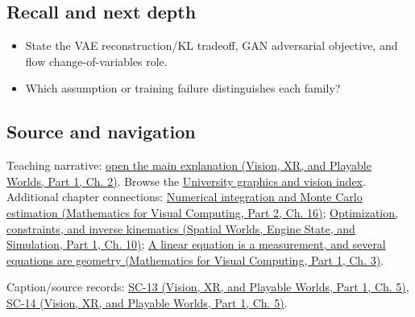 \subsection{Recall and next depth}\label{appendix-2c568f05ee34-recall-and-next-depth}

\hypertarget{appendix-2c568f05ee34-recall-and-next-depth}{}

\begin{itemize}
\tightlist
\item
  State the VAE reconstruction/KL tradeoff, GAN adversarial objective, and flow change-of-variables role.
\item
  Which assumption or training failure distinguishes each family?
\end{itemize}

\subsection{Source and navigation}\label{appendix-2c568f05ee34-source-and-navigation}

\hypertarget{appendix-2c568f05ee34-source-and-navigation}{}

Teaching narrative: \href{../07-Vision-XR-and-Playable-Worlds-P01/main.pdf\#nameddest=04-visual-computing-ii-ch031-generative-models-learn-distributions-and-samplers}{open the main explanation (Vision, XR, and Playable Worlds, Part 1, Ch. 2)}. Browse the \hyperref[appendix-a6d556a4ef50-university-graphics-vision-and-photography---independent-series]{University graphics and vision index}. Additional chapter connections: \href{../02-Mathematics-for-Visual-Computing-P02/main.pdf\#nameddest=03-visual-computing-i-ch012-numerical-integration-and-monte-carlo-estimation}{Numerical integration and Monte Carlo estimation (Mathematics for Visual Computing, Part 2, Ch. 16)}; \href{../05-Spatial-Worlds-Engine-State-and-Simulation-P01/main.pdf\#nameddest=04-visual-computing-ii-ch029-optimization-constraints-and-inverse-kinematics}{Optimization, constraints, and inverse kinematics (Spatial Worlds, Engine State, and Simulation, Part 1, Ch. 10)}; \href{../02-Mathematics-for-Visual-Computing-P01/main.pdf\#nameddest=01-foundations-i-ch019-a-linear-equation-is-a-measurement-and-several-equations-are-geometry}{A linear equation is a measurement, and several equations are geometry (Mathematics for Visual Computing, Part 1, Ch. 3)}.

Caption/source records: \href{../07-Vision-XR-and-Playable-Worlds-P01/main.pdf\#nameddest=04-visual-computing-ii-ch036-sc-13---stanford-cs231n-deep-learning-for-computer-vision-spring-2025-lecture-13-generative-models-1}{SC-13 (Vision, XR, and Playable Worlds, Part 1, Ch. 5)}, \href{../07-Vision-XR-and-Playable-Worlds-P01/main.pdf\#nameddest=04-visual-computing-ii-ch036-sc-14---stanford-cs231n-deep-learning-for-computer-vision-spring-2025-lecture-14-generative-models-2}{SC-14 (Vision, XR, and Playable Worlds, Part 1, Ch. 5)}.
